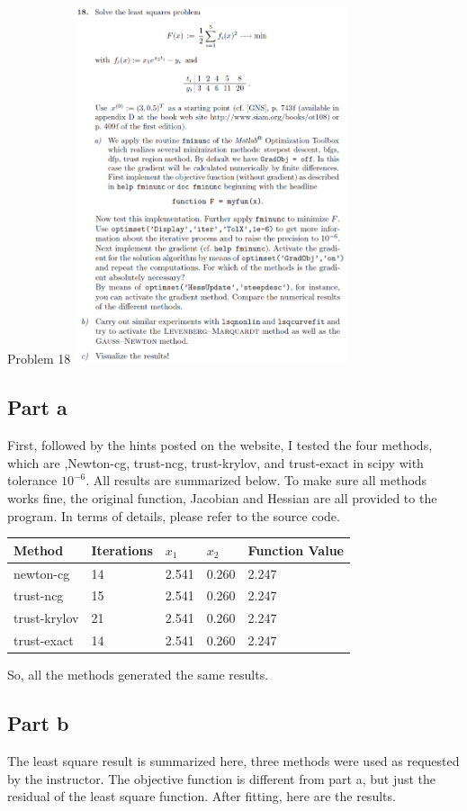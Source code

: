 \documentclass[10pt]{article}
\begin{document}
\begin{section}{Problem 18}
	\includegraphics[width=8cm]{img/problem18.png}
	\subsection{Part a}
	First, followed by the hints posted on the website, I tested the four methods, which are ,Newton-cg, trust-ncg, trust-krylov, and trust-exact in scipy with tolerance $10^{-6}$. All results are summarized below. To make sure all methods works fine, the original function, Jacobian and Hessian are all provided to the program. In terms of details, please refer to the source code. 

    	\begin{tabular}{lllll}
    		\hline
    		Method &Iterations & $x_1$ & $x_2$& Function Value \\
    		\hline\hline
			newton-cg  & 14  & 2.541  & 0.260& 2.247    \\
			trust-ncg  & 15   & 2.541  & 0.260 & 2.247    \\
			trust-krylov & 21   & 2.541  & 0.260 & 2.247 \\
			trust-exact  & 14  & 2.541  & 0.260 & 2.247
    	 \end{tabular}
     
    So, all the methods generated the same results.  
	\subsection{Part b}
	The least square result is summarized here, three methods were used as requested by the instructor. The objective function is different from part a, but just the residual of the least square function. After fitting, here are the results. 
	

\end{section}
\end{document}
